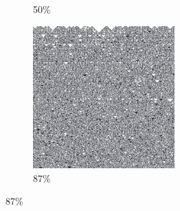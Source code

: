 \documentclass[12pt, fleqn]{report}                             %
\theoremstyle{break}                                            %
\begin{document}
\begin{figure}[ht!]
\begin{subfigure}[b]{0.4\linewidth}
          \caption{50\%}
        \end{subfigure}
        \begin{subfigure}[b]{0.4\linewidth}
          \includegraphics[width=0.6\textwidth]{Images/150/d.png}
          \caption{87\%}
        \end{subfigure}
      \end{figure}
\end{document}
